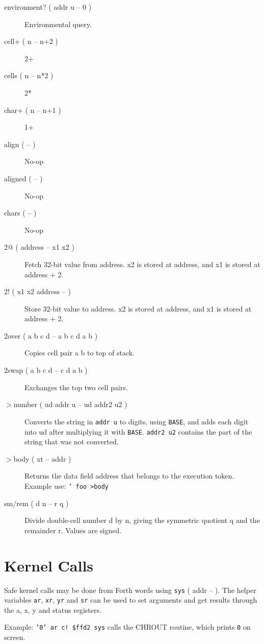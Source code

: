 \begin{description}
    \item[environment? ( addr u -- 0 )] Environmental query.
    \item[cell+ ( n -- n+2 )] 2+
    \item[cells ( n -- n*2 )] 2*
    \item[char+ ( n -- n+1 )] 1+
    \item[align ( -- )] No-op
    \item[aligned ( -- )] No-op
    \item[chars ( -- )] No-op
    \item[2@ ( address -- x1 x2 )] Fetch 32-bit value from address. x2 is stored at address, and x1 is stored at address + 2.
    \item[2! ( x1 x2 address -- )] Store 32-bit value to address. x2 is stored at address, and x1 is stored at address + 2.
    \item[2over ( a b c d -- a b c d a b )] Copies cell pair a b to top of stack.
    \item[2swap ( a b c d -- c d a b )] Exchanges the top two cell pairs.
    \item[$>$number ( ud addr u -- ud addr2 u2 )] Converts the string in \texttt{addr u} to digits, using \texttt{BASE}, and adds each digit into ud after multiplying it with \texttt{BASE}. \texttt{addr2 u2} contains the part of the string that was not converted.
    \item[$>$body ( xt -- addr )] Returns the data field address that belongs to the execution token. Example use: \texttt{' foo >body}
    \item[sm/rem ( d n -- r q )] Divide double-cell number d by n, giving the symmetric quotient q and the remainder r. Values are signed.

\end{description}

\section{Kernel Calls}

Safe kernel calls may be done from Forth words using \texttt{sys} ( addr -- ). The helper variables \texttt{ar}, \texttt{xr}, \texttt{yr} and \texttt{sr} can be used to set arguments and get results through the a, x, y and status registers.

Example: \texttt{'0' ar c! \$ffd2 sys} calls the CHROUT routine, which prints \texttt{0} on screen.
